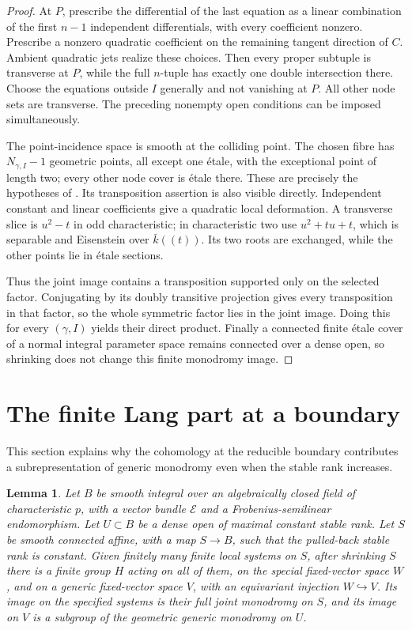 \documentclass[11pt]{article}
\newtheorem{lemma}[theorem]{Lemma}
\theoremstyle{remark}\newtheorem{remark}[theorem]{Remark}
\begin{document}
\begin{proof}
At $P$, prescribe the differential of the last equation as a linear combination of the first $n-1$ independent differentials, with every coefficient nonzero. Prescribe a nonzero quadratic coefficient on the remaining tangent direction of $C$. Ambient quadratic jets realize these choices. Then every proper subtuple is transverse at $P$, while the full $n$-tuple has exactly one double intersection there. Choose the equations outside $I$ generally and not vanishing at $P$. All other node sets are transverse. The preceding nonempty open conditions can be imposed simultaneously.

The point-incidence space is smooth at the colliding point. The chosen fibre has $N_{\gamma,I}-1$ geometric points, all except one \'etale, with the exceptional point of length two; every other node cover is \'etale there. These are precisely the hypotheses of \citet[Proposition~3.1, pp.~7--8]{Entin}. Its transposition assertion is also visible directly. Independent constant and linear coefficients give a quadratic local deformation. A transverse slice is $u^2-t$ in odd characteristic; in characteristic two use $u^2+tu+t$, which is separable and Eisenstein over $\bar k((t))$. Its two roots are exchanged, while the other points lie in \'etale sections.

Thus the joint image contains a transposition supported only on the selected factor. Conjugating by its doubly transitive projection gives every transposition in that factor, so the whole symmetric factor lies in the joint image. Doing this for every $(\gamma,I)$ yields their direct product. Finally a connected finite \'etale cover of a normal integral parameter space remains connected over a dense open, so shrinking does not change this finite monodromy image.
\end{proof}

\section{The finite Lang part at a boundary}\label{sec:boundary}

This section explains why the cohomology at the reducible boundary contributes a subrepresentation of generic monodromy even when the stable rank increases.

\begin{lemma}\label{lem:boundary}
Let $B$ be smooth integral over an algebraically closed field of characteristic $p$, with a vector bundle $\mathcal E$ and a Frobenius-semilinear endomorphism. Let $U\subset B$ be a dense open of maximal constant stable rank. Let $S$ be smooth connected affine, with a map $S\to B$, such that the pulled-back stable rank is constant. Given finitely many finite local systems on $S$, after shrinking $S$ there is a finite group $H$ acting on all of them, on the special fixed-vector space $W$, and on a generic fixed-vector space $V$, with an equivariant injection $W\hookrightarrow V$. Its image on the specified systems is their full joint monodromy on $S$, and its image on $V$ is a subgroup of the geometric generic monodromy on $U$.
\end{lemma}
\end{document}
